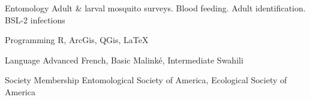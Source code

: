 

\begin{cvskills}

  \cvskill
    {Entomology} %
    {Adult \& larval mosquito surveys.  Blood feeding. Adult identification. BSL-2 infections} %

  \cvskill
    {Programming} %
    {R, ArcGis, QGis, LaTeX} %

  \cvskill
    {Language} %
    {Advanced French, Basic Malink\'e, Intermediate Swahili} %

  \cvskill
    {Society Membership}
    {Entomological Society of America, Ecological Society of America}

\end{cvskills}
